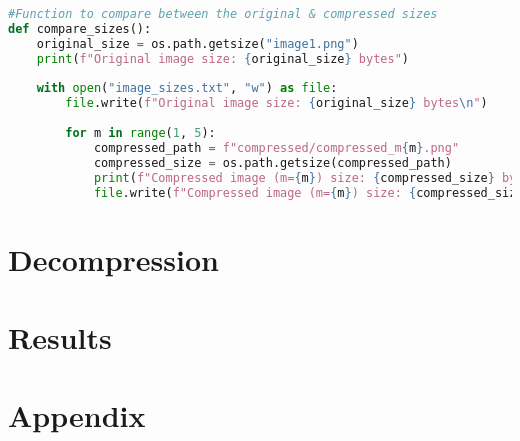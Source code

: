 \documentclass{report}
\begin{document}
\lstset{style=mystyle}
\begin{lstlisting}[language=Python, caption=compress img given m,label=lst:compress-img-helper]
#Function to compare between the original & compressed sizes
def compare_sizes():
    original_size = os.path.getsize("image1.png")
    print(f"Original image size: {original_size} bytes")
    
    with open("image_sizes.txt", "w") as file:
        file.write(f"Original image size: {original_size} bytes\n")
        
        for m in range(1, 5):
            compressed_path = f"compressed/compressed_m{m}.png"
            compressed_size = os.path.getsize(compressed_path)
            print(f"Compressed image (m={m}) size: {compressed_size} bytes")
            file.write(f"Compressed image (m={m}) size: {compressed_size} bytes\n")
\end{lstlisting}



\chapter{Decompression}

\chapter{Results}

\appendix
\chapter{Appendix}
\end{document}
